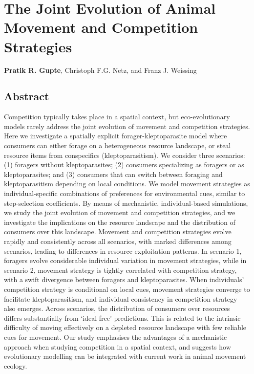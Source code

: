 \chapter{The Joint Evolution of Animal Movement and Competition Strategies}\label{ch:kleptomove}

\noindent \textbf{Pratik R. Gupte}, Christoph F.G. Netz, and Franz J. Weissing

\section*{Abstract}


\small{
    Competition typically takes place in a spatial context, but eco-evolutionary models rarely address the joint evolution of movement and competition strategies. 
    Here we investigate a spatially explicit forager-kleptoparasite model where consumers can either forage on a heterogeneous resource landscape, or steal resource items from conspecifics (kleptoparasitism). 
    We consider three scenarios: (1) foragers without kleptoparasites; (2) consumers specializing as foragers or as kleptoparasites; and (3) consumers that can switch between foraging and kleptoparasitism depending on local conditions.
    We model movement strategies as individual-specific combinations of preferences for environmental cues, similar to step-selection coefficients.
    By means of mechanistic, individual-based simulations, we study the joint evolution of movement and competition strategies, and we investigate the implications on the resource landscape and the distribution of consumers over this landscape.
    Movement and competition strategies evolve rapidly and consistently across all scenarios, with marked differences among scenarios, leading to differences in resource exploitation patterns.
    In scenario 1, foragers evolve considerable individual variation in movement strategies, while in scenario 2, movement strategy is tightly correlated with competition strategy, with a swift divergence between foragers and kleptoparasites.
    When individuals' competition strategy is conditional on local cues, movement strategies converge to facilitate kleptoparasitism, and individual consistency in competition strategy also emerges.
    Across scenarios, the distribution of consumers over resources differs substantially from `ideal free' predictions. 
    This is related to the intrinsic difficulty of moving effectively on a depleted resource landscape with few reliable cues for movement.
    Our study emphasises the advantages of a mechanistic approach when studying competition in a spatial context, and suggests how evolutionary modelling can be integrated with current work in animal movement ecology.

}

\clearpage
